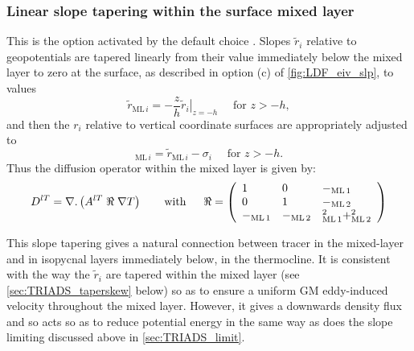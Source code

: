 \documentclass[../main/NEMO_manual]{subfiles}
\newcommand{\rML}[1][i]{\ensuremath{_{\mathrm{ML}\,#1}}}
\newcommand{\rMLt}[1][i]{\tilde{r}_{\mathrm{ML}\,#1}}
\begin{document}
\subsubsection{Linear slope tapering within the surface mixed layer}
\label{sec:TRIADS_lintaper}

This is the option activated by the default choice .
Slopes $\tilde{r}_i$ relative to geopotentials are tapered linearly from their value immediately below
the mixed layer to zero at the surface, as described in option (c) of \autoref{fig:LDF_eiv_slp}, to values
\begin{equation}
  \label{eq:TRIADS_rmtilde}
  \rMLt = -\frac{z}{h}\left.\tilde{r}_i\right|_{z=-h}\quad \text{ for  } z>-h,
\end{equation}
and then the $r_i$ relative to vertical coordinate surfaces are appropriately adjusted to
\[
  \rML =\rMLt -\sigma_i \quad \text{ for  } z>-h.
\]
Thus the diffusion operator within the mixed layer is given by:
\[
  D^{lT}=\nabla {\mathrm {\mathbf .}}\left( {A^{lT}\;\Re \;\nabla T} \right) \qquad
  \mbox{with}\quad \;\;\Re =\left( {{
        \begin{array}{*{20}c}
          1 \hfill & 0 \hfill & {-\rML[1]}\hfill \\
          0 \hfill & 1 \hfill & {-\rML[2]} \hfill \\
          {-\rML[1]}\hfill &   {-\rML[2]} \hfill & {\rML[1]^2+\rML[2]^2} \hfill
        \end{array}
      }} \right)
\]

This slope tapering gives a natural connection between tracer in the mixed-layer and
in isopycnal layers immediately below, in the thermocline.
It is consistent with the way the $\tilde{r}_i$ are tapered within the mixed layer
(see \autoref{sec:TRIADS_taperskew} below) so as to ensure a uniform GM eddy-induced velocity throughout the mixed layer.
However, it gives a downwards density flux and so acts so as to reduce potential energy in the same way as
does the slope limiting discussed above in \autoref{sec:TRIADS_limit}.
\end{document}
